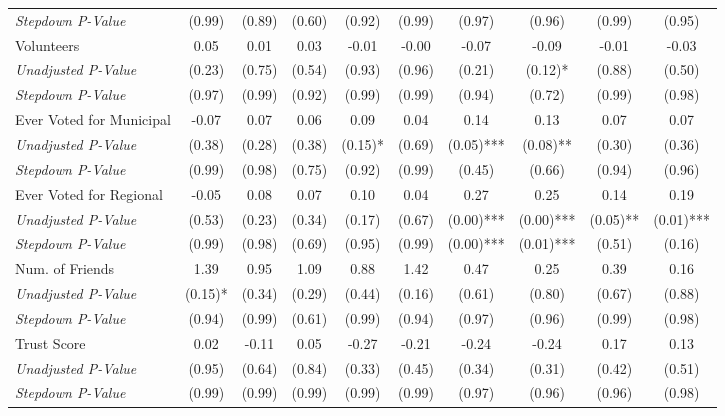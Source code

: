 \begin{tabular}{l c c c c c c c c c}
\quad \textit{Stepdown P-Value} & (0.99) & (0.89) & (0.60) & (0.92) & (0.99) & (0.97) & (0.96) & (0.99) & (0.95) \\
Volunteers & 0.05 & 0.01 & 0.03 & -0.01 & -0.00 & -0.07 & -0.09 & -0.01 & -0.03 \\
\quad \textit{Unadjusted P-Value} & (0.23) & (0.75) & (0.54) & (0.93) & (0.96) & (0.21) & (0.12)* & (0.88) & (0.50) \\
\quad \textit{Stepdown P-Value} & (0.97) & (0.99) & (0.92) & (0.99) & (0.99) & (0.94) & (0.72) & (0.99) & (0.98) \\
Ever Voted for Municipal & -0.07 & 0.07 & 0.06 & 0.09 & 0.04 & 0.14 & 0.13 & 0.07 & 0.07 \\
\quad \textit{Unadjusted P-Value} & (0.38) & (0.28) & (0.38) & (0.15)* & (0.69) & (0.05)*** & (0.08)** & (0.30) & (0.36) \\
\quad \textit{Stepdown P-Value} & (0.99) & (0.98) & (0.75) & (0.92) & (0.99) & (0.45) & (0.66) & (0.94) & (0.96) \\
Ever Voted for Regional & -0.05 & 0.08 & 0.07 & 0.10 & 0.04 & 0.27 & 0.25 & 0.14 & 0.19 \\
\quad \textit{Unadjusted P-Value} & (0.53) & (0.23) & (0.34) & (0.17) & (0.67) & (0.00)*** & (0.00)*** & (0.05)** & (0.01)*** \\
\quad \textit{Stepdown P-Value} & (0.99) & (0.98) & (0.69) & (0.95) & (0.99) & (0.00)*** & (0.01)*** & (0.51) & (0.16) \\
Num. of Friends & 1.39 & 0.95 & 1.09 & 0.88 & 1.42 & 0.47 & 0.25 & 0.39 & 0.16 \\
\quad \textit{Unadjusted P-Value} & (0.15)* & (0.34) & (0.29) & (0.44) & (0.16) & (0.61) & (0.80) & (0.67) & (0.88) \\
\quad \textit{Stepdown P-Value} & (0.94) & (0.99) & (0.61) & (0.99) & (0.94) & (0.97) & (0.96) & (0.99) & (0.98) \\
Trust Score & 0.02 & -0.11 & 0.05 & -0.27 & -0.21 & -0.24 & -0.24 & 0.17 & 0.13 \\
\quad \textit{Unadjusted P-Value} & (0.95) & (0.64) & (0.84) & (0.33) & (0.45) & (0.34) & (0.31) & (0.42) & (0.51) \\
\quad \textit{Stepdown P-Value} & (0.99) & (0.99) & (0.99) & (0.99) & (0.99) & (0.97) & (0.96) & (0.96) & (0.98) \\
\bottomrule
\end{tabular}
